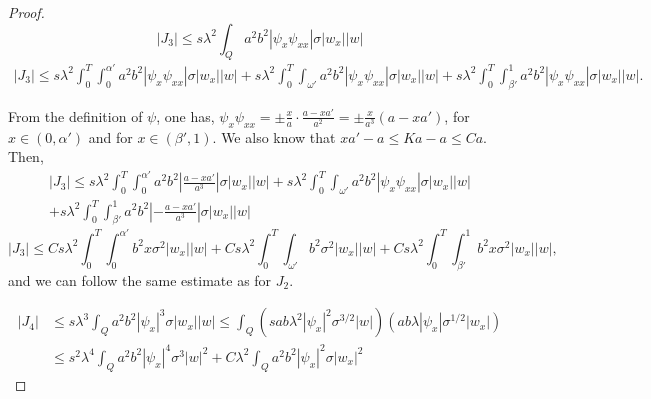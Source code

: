 \documentclass[11pt,oneside,a4papper]{osajnl}
\begin{document}
\begin{proof}
    $$|J_3|\leq s\lambda^2\int_Q a^2b^2|\psi_x\psi_{xx}| \sigma |w_x| |w|$$
    \begin{multline*}
	|J_3|\leq s\lambda^2\int_0^T \int_0^{\alpha'}          a^2b^2|\psi_x\psi_{xx}| \sigma |w_x| |w| +  s\lambda^2\int_0^T\int_{\omega'} a^2b^2|\psi_x\psi_{xx}| \sigma |w_x| |w|
	+ s\lambda^2\int_0^T \int_{\beta'}^1 a^2b^2|\psi_x\psi_{xx}| \sigma |w_x| |w|.
    \end{multline*}
    
    From the definition of $\psi$, one has,
    $\psi_x\psi_{xx}=\pm \frac{x}{a}\cdot \frac{a-xa'}{a^2}=\pm \frac{x}{a^3}(a-xa')$, for $x\in (0,\alpha')$ and for $x\in (\beta',1)$.
    We also know that $xa'-a\leq Ka-a\leq Ca$. Then,
    \begin{multline*}
		|J_3|\leq s\lambda^2\int_0^T \int_0^{\alpha'} a^2b^2\left|  \frac{a-xa'}{a^3} \right| \sigma |w_x| |w| +  s\lambda^2\int_0^T\int_{\omega'} a^2b^2|\psi_x\psi_{xx}| \sigma |w_x| |w|\\
		+ s\lambda^2\int_0^T \int_{\beta'}^1 a^2b^2\left| - \frac{a-xa'}{a^3} \right| \sigma |w_x| |w|
    \end{multline*}
    $$|J_3|\leq Cs\lambda^2\int_0^T \int_0^{\alpha'} b^2x \sigma^2 |w_x| |w| +  Cs\lambda^2\int_0^T\int_{\omega'} b^2 \sigma^2 |w_x| |w| +C s\lambda^2\int_0^T \int_{\beta'}^1 b^2x \sigma^2 |w_x| |w|,$$
    and we can follow the same estimate as for $J_2$. 
 
    \begin{equation*}
    \begin{split}
    |J_4| &\leq s\lambda^3\int_Q a^2b^2|\psi_x|^3 \sigma |w_x|  |w|\leq \int_{Q} \left( sab\lambda^{2}|\psi_x|^2\sigma^{3/2}|w|\right)\left( ab\lambda|\psi_x|\sigma^{1/2}|w_x| \right) \\
    &\leq s^2\lambda^4\int_Qa^2b^2|\psi_x|^4 \sigma^3 |w|^2+C\lambda^2\int_{Q} a^2b^2|\psi_x|^2 \sigma |w_x|^2
    \end{split}    
    \end{equation*}
\end{proof}
\end{document}
